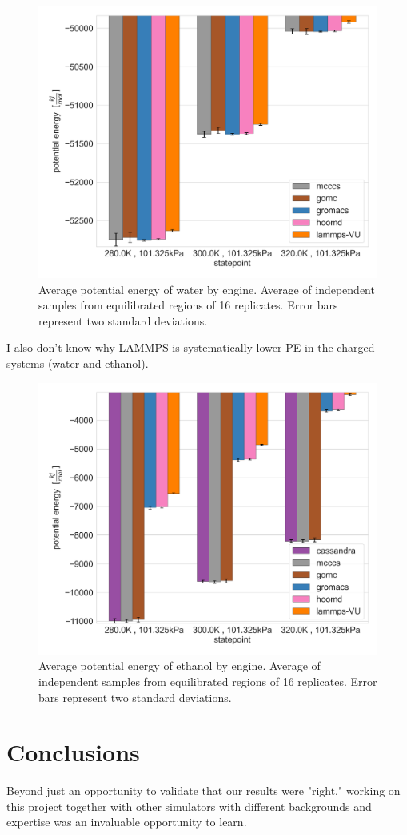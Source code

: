 \begin{figure}[h!]
    \centering
    \includegraphics[width=0.8\linewidth,keepaspectratio]{figures/rep_study/waterSPCE_pe_summary.png}
    \caption{Average potential energy of water by engine. Average of independent samples from equilibrated regions of 16 replicates. Error bars represent two standard deviations.}\label{fig:water_pe}
\end{figure}
I also don't know why LAMMPS is systematically lower PE in the charged systems (water and ethanol).
\begin{figure}[h!]
    \centering
    \includegraphics[width=0.8\linewidth,keepaspectratio]{figures/rep_study/ethanolAA_pe_summary.png}
    \caption{Average potential energy of ethanol by engine. Average of independent samples from equilibrated regions of 16 replicates. Error bars represent two standard deviations.}\label{fig:ethanol_pe}
\end{figure}

\section{Conclusions}

Beyond just an opportunity to validate that our results were "right," working on this project together with other simulators with different backgrounds and expertise was an invaluable opportunity to learn.
